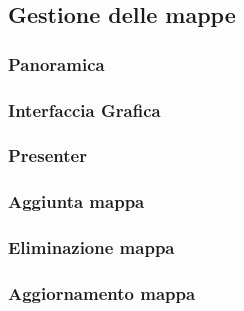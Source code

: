 \documentclass[../Funzionalita.tex]{subfiles}
\begin{document}
	\subsection{Gestione delle mappe}
	\label{subsec:GestioneDelleMappe}
	
		\subsubsection{Panoramica}
		
		\subsubsection{Interfaccia Grafica}
		
		\subsubsection{Presenter}
		
		\subsubsection{Aggiunta mappa}
		
		\subsubsection{Eliminazione mappa}
		
		\subsubsection{Aggiornamento mappa}
		
\end{document}
